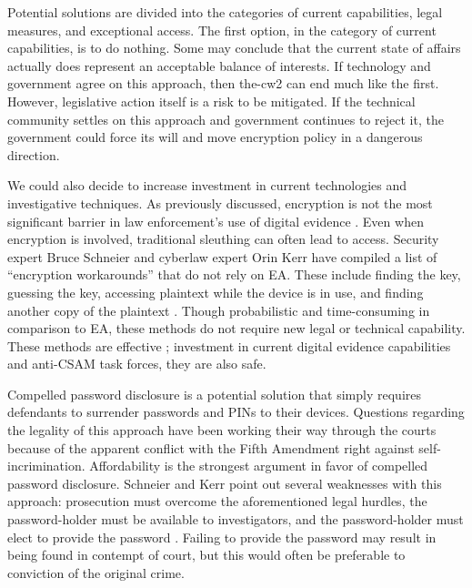 Potential solutions are divided into the categories of current capabilities, legal measures, and exceptional access. The
first option, in the category of current capabilities, is to do nothing. Some may conclude that the current state of
affairs actually does represent an acceptable balance of interests. If technology and government agree on this approach,
then \ac{the-cw2} can end much like the first. However, legislative action itself is a risk to be mitigated. If the
technical community settles on this approach and government continues to reject it, the government could force its will
and move encryption policy in a dangerous direction.

We could also decide to increase investment in current technologies and investigative techniques. As previously
discussed, encryption is not the most significant barrier in law enforcement's use of digital evidence
\cite{carter_2018}. Even when encryption is involved, traditional sleuthing can often lead to access. Security expert
Bruce Schneier and cyberlaw expert Orin Kerr have compiled a list of ``encryption workarounds'' that do not rely on
\ac{EA}. These include finding the key, guessing the key, accessing plaintext while the device is in use, and finding
another copy of the plaintext \cite{kerr_encryption_2017}. Though probabilistic and time-consuming in comparison to
\ac{EA}, these methods do not require new legal or technical capability. These methods are effective
\cite{greenberg_2018}; investment in current digital evidence capabilities and anti-\ac{CSAM} task forces, they are also
safe.

Compelled password disclosure is a potential solution that simply requires defendants to surrender passwords and
\acp{PIN} to their devices. Questions regarding the legality of this approach have been working their way through the
courts \cite{bittenbender_2019} \cite{sobel_2019} because of the apparent conflict with the Fifth Amendment right
against self-incrimination. Affordability is the strongest argument in favor of compelled password disclosure. Schneier
and Kerr point out several weaknesses with this approach: prosecution must overcome the aforementioned legal hurdles,
the password-holder must be available to investigators, and the password-holder must elect to provide the password
\cite{kerr_encryption_2017}. Failing to provide the password may result in being found in contempt of court, but this
would often be preferable to conviction of the original crime.

